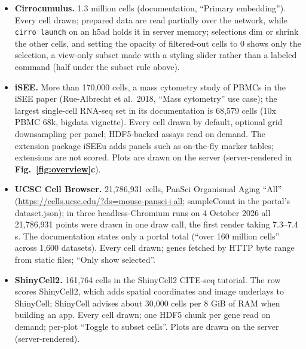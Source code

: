\documentclass[11pt]{article}
\begin{document}
\begin{itemize}[nosep]
\item \textbf{Cirrocumulus.} 1.3 million cells (documentation, ``Primary embedding''). Every cell drawn; prepared data are read partially over the network, while \texttt{cirro launch} on an h5ad holds it in server memory; selections dim or shrink the other cells, and setting the opacity of filtered-out cells to 0 shows only the selection, a view-only subset made with a styling slider rather than a labeled command (half under the subset rule above).
\item \textbf{iSEE.} More than 170,000 cells, a mass cytometry study of PBMCs in the iSEE paper (Rue-Albrecht et al.\ 2018, ``Mass cytometry'' use case); the largest single-cell RNA-seq set in its documentation is 68,579 cells (10x PBMC 68k, bigdata vignette). Every cell drawn by default, optional grid downsampling per panel; HDF5-backed assays read on demand. The extension package iSEEu adds panels such as on-the-fly marker tables; extensions are not scored. Plots are drawn on the server (server-rendered in \textbf{Fig.~\ref{fig:overview}c}).
\item \textbf{UCSC Cell Browser.} 21,786,931 cells, PanSci Organismal Aging ``All'' (\url{https://cells.ucsc.edu/?ds=mouse-pansci+all}; sampleCount in the portal's dataset.json); in three headless-Chromium runs on 4 October 2026 all 21,786,931 points were drawn in one draw call, the first render taking 7.3--7.4 s. The documentation states only a portal total (``over 160 million cells'' across 1,600 datasets). Every cell drawn; genes fetched by HTTP byte range from static files; ``Only show selected''.
\item \textbf{ShinyCell2.} 161,764 cells in the ShinyCell2 CITE-seq tutorial. The row scores ShinyCell2, which adds spatial coordinates and image underlays to ShinyCell; ShinyCell advises about 30,000 cells per 8 GiB of RAM when building an app. Every cell drawn; one HDF5 chunk per gene read on demand; per-plot ``Toggle to subset cells''. Plots are drawn on the server (server-rendered).

\end{itemize}
\end{document}
